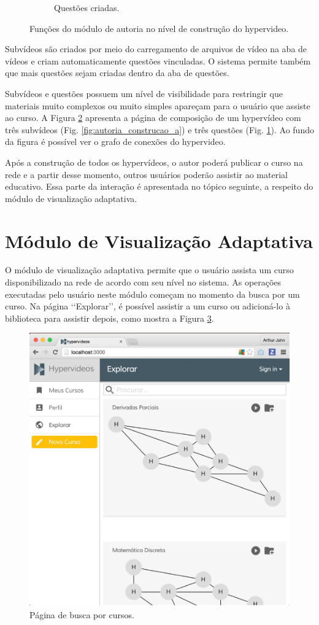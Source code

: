 \begin{figure}[h!]
\begin{subfigure}{.5\textwidth}
  		\caption{Questões criadas.}
  		\label{fig:autoria_construcao_b}
	\end{subfigure}%
  	\caption{Funções do módulo de autoria no nível de construção do hypervideo.}
  	\label{fig:autoria_construcao}
\end{figure}

Subvídeos são criados por meio do carregamento de arquivos de vídeo na aba de vídeos e criam automaticamente questões vinculadas. O sistema permite também que mais questões sejam criadas dentro da aba de questões. 

Subvídeos e questões possuem um nível de visibilidade para restringir que materiais muito complexos ou muito simples apareçam para o usuário que assiste ao curso. A Figura \ref{fig:autoria_construcao} apresenta a página de composição de um hypervídeo com três subvídeos (Fig. \ref{fig:autoria_construcao_a}) e três questões (Fig. \ref{fig:autoria_construcao_b}). Ao fundo da figura é possível ver o grafo de conexões do hypervideo.

Após a construção de todos os hypervídeos, o autor poderá publicar o curso na rede e a partir desse momento, outros usuários poderão assistir ao material educativo. Essa parte da interação é apresentada no tópico seguinte, a respeito do módulo de visualização adaptativa.

\section{Módulo de Visualização Adaptativa}

O módulo de visualização adaptativa permite que o usuário assista um curso disponibilizado na rede de acordo com seu nível no sistema. As operações executadas pelo usuário neste módulo começam no momento da busca por um curso. Na página \lq\lq Explorar\rq\rq, é possível assistir a um curso ou adicioná-lo à biblioteca para assistir depois, como mostra a Figura \ref{fig:explorar}.

\begin{figure}[h!]
  	\centering
  	\includegraphics[width=.6\linewidth]{figuras/explorar.eps}
  	\caption{Página de busca por cursos.}
  	\label{fig:explorar}
\end{figure}

